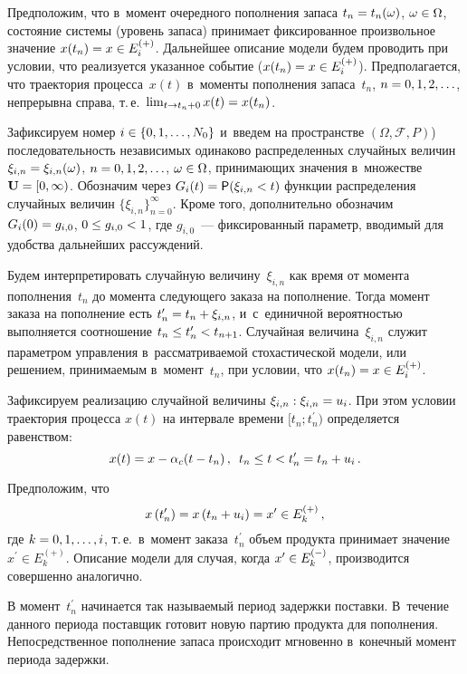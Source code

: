 \begin{multicols}{2}
Предположим, что в~момент очередного пополнения 
запаса $t_n\hm= t_n(\omega)$, $\omega\hm\in \Omega$, состояние системы 
(уровень запаса) принимает фиксированное произвольное значение $x(t_n)\hm= 
x\hm\in E_i^{(+)}$. Дальнейшее описание модели будем проводить при 
условии, что реализуется указанное событие ($x(t_n)\hm= x\hm\in E_i^{(+)}$). 
Предполагается, что траектория процесса~$x(t)$ в~моменты пополнения 
запаса~$t_n$, $n\hm=0,1,2,\ldots$, непрерывна справа, т.\,е.\ $\lim\nolimits_{t\to 
t_n+0} x(t)\hm= x(t_n)$. 
  
  Зафиксируем номер $i\hm\in \{0,1,\ldots ,N_0\}$ и~введем на пространстве 
$(\Omega, \mathcal{F}, P)$) последовательность независимых одинаково 
распределенных случайных величин $\xi_{i,n} \hm= \xi_{i,n}(\omega)$, 
$n\hm=0,1,2,\ldots$, $\omega\hm\in \Omega$, принимающих значения 
в~множестве $\mathbf{U}\hm = [0, \infty)$. Обозначим через $G_i(t)\hm= 
{\sf P}(\xi_{i,n}<t)$ функции распределения случайных величин 
$\{ \xi_{i,n}\}^\infty_{n=0}$. Кроме того, дополнительно обозначим $G_i(0)\hm= 
g_{i,0}$, $0\hm\leq g_{i,0}\hm<1$, где $g_{i,0}$~--- фиксированный параметр, 
вводимый для удобства дальнейших рассуждений.
  
  Будем интерпретировать случайную величину~$\xi_{i,n}$ как время от 
момента пополнения~$t_n$ до момента следующего заказа на пополнение. 
Тогда момент заказа на пополнение есть $t^\prime_n \hm= t_n\hm+\xi_{i,n}$, 
и~с~единичной вероятностью выполняется соотношение $t_n\hm\leq t_n^\prime 
\hm< t_{n+1}$. Случайная величина~$\xi_{i,n}$ служит параметром управ\-ле\-ния 
в~рассматриваемой стохастической модели, или решением, при\-ни\-ма\-емым 
в~момент~$t_n$, при условии, что $x(t_n)\hm= x\hm\in E_i^{(+)}$.
  
  Зафиксируем реализацию случайной величины  $\xi_{i,n}: \xi_{i,n}\hm=u_i$. При этом 
условии траектория процесса $x(t)$ на интервале времени $[t_n;t_n^\prime)$ 
определяется равенством:
  \begin{equation*}
  x(t)=x-\alpha_c(t-t_n)\,,\enskip 
  t_n\leq t<t_n^\prime =t_n+u_i\,.
  \end{equation*}
  
  Предположим, что 
  $$
  x\left(t_n^\prime\right)= x\left(t_n\hm+u_i\right)= x^\prime\hm\in 
E_k^{(+)}\,,
$$
 где $k\hm= 0,1,\ldots, i$, т.\,е.\ в~момент заказа~$t_n^\prime$ объем 
продукта принимает значение $x^\prime\in E_k^{(+)}$. Описание модели для 
случая, когда $x^\prime\hm\in E_k^{(-)}$, производится совершенно аналогично.
  
  В момент~$t_n^\prime$ начинается так называемый период задержки 
поставки. В~течение данного периода поставщик готовит новую партию 
продукта для пополнения. Непосредственное пополнение запаса происходит 
мгновенно в~конечный момент периода задержки.
  

\end{multicols}
